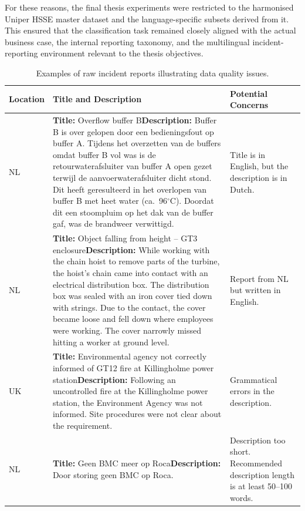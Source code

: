 \documentclass[11pt, titlepage, bibliography=totoc]{scrreprt}
\begin{document}
For these reasons, the final thesis experiments were restricted to the harmonised Uniper HSSE master dataset and the language-specific subsets derived from it. This ensured that the classification task remained closely aligned with the actual business case, the internal reporting taxonomy, and the multilingual incident-reporting environment relevant to the thesis objectives.

\begin{table}[h!]
\centering
\caption{Examples of raw incident reports illustrating data quality issues.}
\label{tab:rawdata}
\begin{footnotesize}
\begin{tabular}{p{1.3cm} p{8.2cm} p{6.5cm}}
\toprule
\textbf{Location} & \textbf{Title and Description} & \textbf{Potential Concerns} \\
\midrule
NL & \textbf{Title:} Overflow buffer B\newline \textbf{Description:} Buffer B is over gelopen door een bedieningsfout op buffer A. Tijdens het overzetten van de buffers omdat buffer B vol was is de retourwaterafsluiter van buffer A open gezet terwijl de aanvoerwaterafsluiter dicht stond. Dit heeft geresulteerd in het overlopen van buffer B met heet water (ca.~96$^\circ$C). Doordat dit een stoompluim op het dak van de buffer gaf, was de brandweer verwittigd. & Title is in English, but the description is in Dutch. \\
\addlinespace
NL & \textbf{Title:} Object falling from height -- GT3 enclosure\newline \textbf{Description:} While working with the chain hoist to remove parts of the turbine, the hoist's chain came into contact with an electrical distribution box. The distribution box was sealed with an iron cover tied down with strings. Due to the contact, the cover became loose and fell down where employees were working. The cover narrowly missed hitting a worker at ground level. & Report from NL but written in English. \\
\addlinespace
UK & \textbf{Title:} Environmental agency not correctly informed of GT12 fire at Killingholme power station\newline \textbf{Description:} Following an uncontrolled fire at the Killingholme power station, the Environment Agency was not informed. Site procedures were not clear about the requirement. & Grammatical errors in the description. \\
\addlinespace
NL & \textbf{Title:} Geen BMC meer op Roca\newline \textbf{Description:} Door storing geen BMC op Roca. & Description too short. Recommended description length is at least 50--100 words. \\

\end{tabular}
\end{footnotesize}
\end{table}
\end{document}
